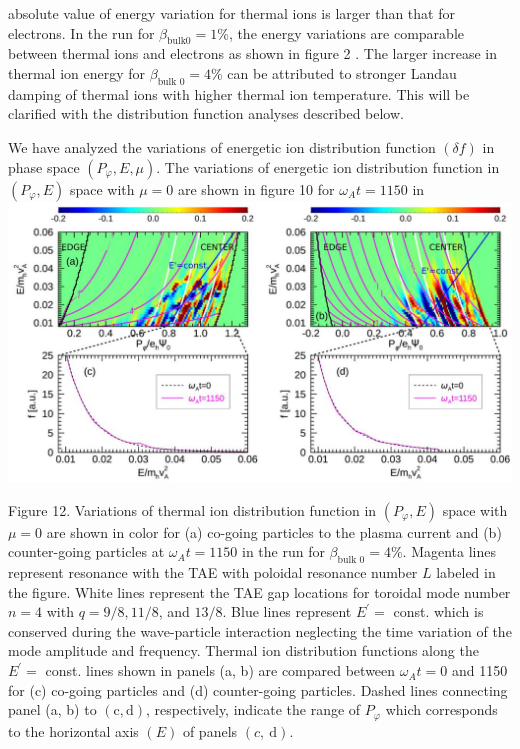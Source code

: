 \documentclass[10pt]{article}
\begin{document}
absolute value of energy variation for thermal ions is larger than that for electrons. In the run for $\beta_{\mathrm{bulk} 0}=1 \%$, the energy variations are comparable between thermal ions and electrons as shown in figure 2 . The larger increase in thermal ion energy for $\beta_{\text {bulk } 0}=4 \%$ can be attributed to stronger Landau damping of thermal ions with higher thermal ion temperature. This will be clarified with the distribution function analyses described below.

We have analyzed the variations of energetic ion distribution function $(\delta f)$ in phase space $\left(P_{\varphi}, E, \mu\right)$. The variations of energetic ion distribution function in $\left(P_{\varphi}, E\right)$ space with $\mu=0$ are shown in figure 10 for $\omega_{A} t=1150$ in
\includegraphics[max width=\textwidth, center]{2023_06_04_de2f4b8aa3fd859f006dg-12}

Figure 12. Variations of thermal ion distribution function in $\left(P_{\varphi}, E\right)$ space with $\mu=0$ are shown in color for (a) co-going particles to the plasma current and (b) counter-going particles at $\omega_{A} t=1150$ in the run for $\beta_{\text {bulk } 0}=4 \%$. Magenta lines represent resonance with the TAE with poloidal resonance number $L$ labeled in the figure. White lines represent the TAE gap locations for toroidal mode number $n=4$ with $q=9 / 8,11 / 8$, and $13 / 8$. Blue lines represent $E^{\prime}=$ const. which is conserved during the wave-particle interaction neglecting the time variation of the mode amplitude and frequency. Thermal ion distribution functions along the $E^{\prime}=$ const. lines shown in panels (a, b) are compared between $\omega_{A} t=0$ and 1150 for (c) co-going particles and (d) counter-going particles. Dashed lines connecting panel (a, b) to $(\mathrm{c}, \mathrm{d})$, respectively, indicate the range of $P_{\varphi}$ which corresponds to the horizontal axis $(E)$ of panels $(c, \mathrm{~d})$.
\end{document}
